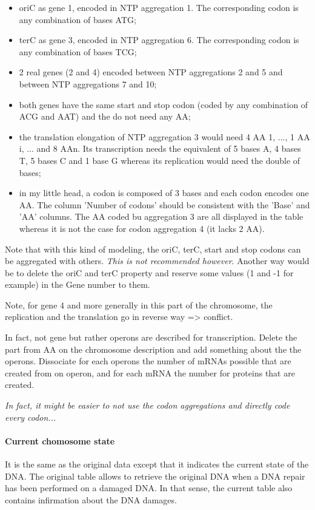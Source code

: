 \begin{itemize}
  \item oriC as gene 1, encoded in NTP aggregation 1. The corresponding codon is any combination of bases ATG;
  \item terC as gene 3, encoded in NTP aggregation 6. The corresponding codon is any combination of bases TCG;
  \item 2 real genes (2 and 4) encoded between NTP aggregations 2 and 5 and between NTP aggregations 7 and 10;
  \item both genes have the same start and stop codon (coded by any combination of ACG and AAT) and the do not need any AA;
  \item the translation elongation of NTP aggregation 3 would need 4 AA 1, ..., 1 AA i, ... and 8 AAn. Its transcription needs the equivalent of 5 bases A, 4 bases T, 5 bases C and 1 base G whereas its replication would need the double of bases;
  \item in my little head, a codon is composed of 3 bases and each codon encodes one AA. The column 'Number of codons' should be consistent with the 'Base' and 'AA' columns. The AA coded bu aggregation 3 are all displayed in the table whereas it is not the case for codon aggregation 4 (it lacks 2 AA).
\end{itemize}
Note that with this kind of modeling, the oriC, terC, start and stop codons can be aggregated with others. \emph{This is not recommended however}. Another way would be to delete the oriC and terC property and reserve some values (1 and -1 for example) in the Gene number to them.

\textcolor[rgb]{1.00,0.00,0.00}{Note, for gene 4 and more generally in this part of the chromosome, the replication and the translation go in reverse way => conflict.}

\medskip

\textcolor[rgb]{1.00,0.00,0.00}{In fact, not gene but rather operons are described for transcription. Delete the part from AA on the chromosome description and add something about the the operons. Dissociate for each operons the number of mRNAs possible that are created from on operon, and for each mRNA the number for proteins that are created.}

\medskip

\textcolor[rgb]{1.00,0.00,0.00}{\emph{In fact, it might be easier to not use the codon aggregations and directly code every codon...}}

\paragraph{Current chomosome state}
\textcolor[rgb]{1.00,0.00,0.00}{It is the same as the original data except that it indicates the current state of the DNA. The original table allows to retrieve the original DNA when a DNA repair has been performed on a damaged DNA. In that sense, the current table also contains infirmation about the DNA damages.}



